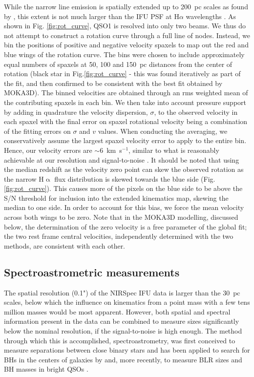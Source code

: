 \documentclass[twocolumn, fleqn]{doc_class}
\newcommand{\Halpha}{\ensuremath{\mathrm{H}\upalpha}\xspace}
\begin{document}
While the narrow line emission is spatially extended up to 200~pc scales as found by , this extent is not much larger than the IFU PSF at H$\alpha$ wavelengths . As shown in Fig. \ref{fig:rot_curve}, QSO1 is resolved into only two beams. We thus do not attempt to construct a rotation curve through a full line of nodes. Instead, we bin the positions of positive and negative velocity spaxels to map out the red and blue wings of the rotation curve. The bins were chosen to include approximately equal numbers of spaxels at 50, 100 and 150~pc distances from the center of rotation (black star in Fig.\ref{fig:rot_curve} - this was found iteratively as part of the fit, and then confirmed to be consistent with the best fit obtained by MOKA3D). The binned velocities are obtained through an rms weighted mean of the contributing spaxels in each bin. We then take into account pressure support by adding in quadrature the velocity dispersion, $\sigma$, to the observed velocity in each spaxel  with the final error on spaxel rotational velocity being a combination of the fitting errors on $\sigma$ and $v$ values. When conducting the averaging, we conservatively assume the largest spaxel velocity error to apply to the entire bin. Hence, our velocity errors are $\sim 6$~km~s$^{-1}$, similar to what is reasonably achievable at our resolution and signal-to-noise . It should be noted that using the median redshift as the velocity zero point can skew the observed rotation as the narrow \Halpha flux distribution is skewed towards the blue side (Fig. \ref{fig:rot_curve}). This causes more of the pixels on the blue side to be above the S/N threshold for inclusion into the extended kinematics map, skewing the median to one side. In order to account for this bias, we force the mean velocity across both wings to be zero. Note that in the MOKA3D modelling, discussed below, the determination of the zero velocity is a free parameter of the global fit; the two rest frame central velocities, independently determined with the two methods, are consistent with each other.

\subsection*{Spectroastrometric measurements}
The spatial resolution (0.1") of the NIRSpec IFU data is larger than the 30~pc scales, below which the influence on kinematics from a point mass with a few tens million masses would be most apparent. However, both spatial and spectral information present in the data can be combined to measure sizes significantly below the nominal resolution, if the signal-to-noise is high enough. The method through which this is accomplished, spectroastrometry, was first conceived to measure separations between close binary stars  and has been applied to search for BHs in the centers of galaxies by  and, more recently, to measure BLR sizes and BH masses in bright QSOs .
\end{document}

